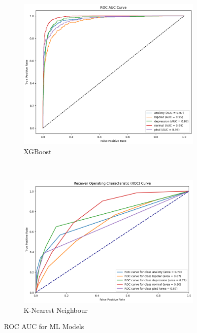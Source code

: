 \begin{figure}[H]
    \hfill
    \begin{subfigure}[b]{0.49\textwidth}
        \centering
        \includegraphics[width=\textwidth]{Images/XG ROC.png}
        \caption{XGBoost}
        \label{XGROC}  %
    \end{subfigure}\
    \hfill
    \begin{subfigure}[b]{0.49\textwidth}
        \centering
        \includegraphics[width=\textwidth]{Images/KNN ROC.png}
        \caption{K-Nearest Neighbour}
        \label{KNNROC}  %
    \end{subfigure}
    \label{fig:comparison}
    \caption{ROC AUC for ML Models}
\end{figure}


